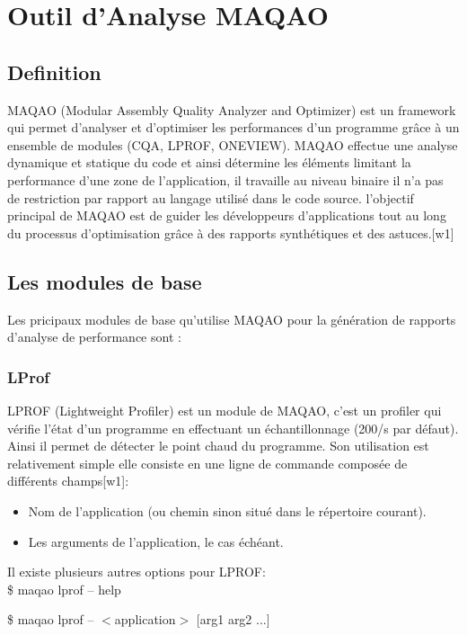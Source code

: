 
\section{Outil d'Analyse MAQAO}
	\subsection{Definition}
	MAQAO (Modular Assembly Quality Analyzer and Optimizer) est un framework qui permet d’analyser et d’optimiser les performances d’un programme grâce à un ensemble de modules (CQA, LPROF, ONEVIEW). MAQAO effectue une analyse dynamique et statique du code et ainsi détermine les éléments limitant la performance d'une zone de l'application, il travaille au niveau binaire il n’a pas de restriction par rapport au langage utilisé dans le code source. l’objectif principal de MAQAO est de guider les développeurs d'applications tout au long du processus d'optimisation grâce à des rapports synthétiques et des astuces.[w1]

	\subsection{Les modules de base }
    Les pricipaux modules de base qu'utilise MAQAO pour la génération de rapports d'analyse de performance sont :
	\subsubsection{LProf}
	    LPROF (Lightweight Profiler) est un module de MAQAO, c’est un profiler qui vérifie l’état d’un programme en effectuant un échantillonnage (200/s par défaut). Ainsi il permet de détecter le point chaud du programme. Son utilisation est relativement simple elle consiste en une ligne de commande composée de différents champs[w1]:\\ 
	    \begin{itemize}
	        \item Nom de l'application (ou chemin sinon situé dans le répertoire courant). 
	        \item Les arguments de l’application, le cas échéant.
	    \end{itemize}
	    Il existe plusieurs autres options pour LPROF:\\
	    
        \$ maqao lprof – help
	    
            \$ maqao lprof -- $<$application$>$ [arg1 arg2 ...]
